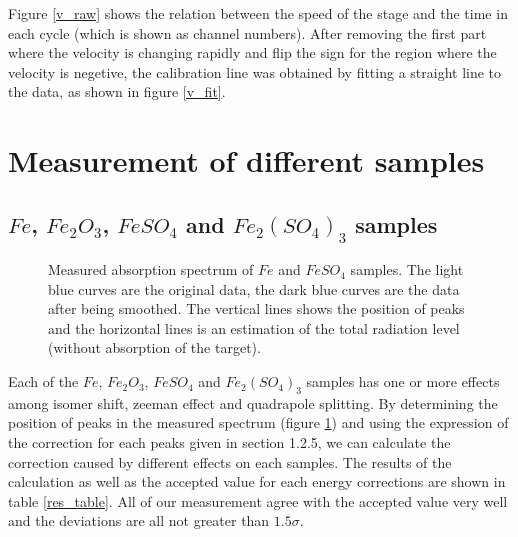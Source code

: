 \documentclass[aps,twocolumn,secnumarabic,balancelastpage,amsmath,amssymb,nofootinbib]{revtex4}
\begin{document}
Figure \ref{v_raw} shows the relation between the speed of the stage and the time in each cycle (which is shown as channel numbers). After removing the first part where the velocity is changing rapidly and flip the sign for the region where the velocity is negetive, the calibration line was obtained by fitting a straight line to the data, as shown in figure \ref{v_fit}.

\section{Measurement of different samples}
\subsection{$Fe$, $Fe_2O_3$, $FeSO_4$ and $Fe_2(SO_4)_3$ samples}
\begin{figure}
  \caption{Measured absorption spectrum of  $Fe$ and  $FeSO_4$ samples. The light blue curves are the original data, the dark blue curves are the data after being smoothed. The vertical lines shows the position of peaks and the horizontal lines is an estimation of the total radiation level (without absorption of the target).}
  \label{samples_raw}
\end{figure}

Each of the $Fe$, $Fe_2O_3$, $FeSO_4$ and $Fe_2(SO_4)_3$ samples has one or more effects among isomer shift, zeeman effect and quadrapole splitting. By determining the position of peaks in the measured spectrum (figure \ref{samples_raw}) and using the expression of the correction for each peaks given in section 1.2.5, we can calculate the correction caused by different effects on each samples. The results of the calculation as well as the accepted value for each energy corrections are shown in table \ref{res_table}. All of our measurement agree with the accepted value very well and the deviations are all not greater than $1.5\sigma$.
\end{document}
